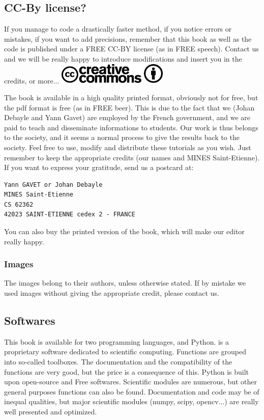 \subsection*{CC-By license?}
If you manage to code a drastically faster method, if you notice errors or mistakes, if you want to add precisions, remember that this book as well as the code is published under a FREE CC-BY license (as in FREE speech). Contact us and we will be really happy to introduce modifications and insert you in the credits, or more...
\includegraphics[height=1cm]{media/cc.logo.pdf}
\includegraphics[height=1cm]{media/BY.pdf}



The book is available in a high quality printed format, obviously not for free, but the pdf format is free (as in FREE beer). This is due to the fact that we (Johan Debayle and Yann Gavet) are employed by the French government, and we are paid to teach and disseminate informations to students. Our work is thus belongs to the society, and it seems a normal process to give the results back to the society. Feel free to use, modify and distribute these tutorials as you wish. Just remember to keep the appropriate credits (our names and MINES Saint-Etienne). If you want to express your gratitude, send us a postcard at:
\begin{verbatim}
Yann GAVET or Johan Debayle
MINES Saint-Etienne
CS 62362
42023 SAINT-ETIENNE cedex 2 - FRANCE
\end{verbatim}

You can also buy the printed version of the book, which will make our editor really happy.

\subsubsection*{Images}
The images belong to their authors, unless otherwise stated. If by mistake we used images without giving the appropriate credit, please contact us.

\subsection*{Softwares}
This book is available for two programming languages, \matlabregistered{} and Python. \matlabregistered{} is a proprietary software dedicated to scientific computing. Functions are grouped into so-called toolboxes. The documentation and the compatibility of the functions are very good, but the price is a consequence of this. Python is built upon open-source and Free softwares. Scientific modules are numerous, but other general purposes functions can also be found. Documentation and code may be of inequal qualities, but major scientific modules (numpy, scipy, opencv...) are really well presented and optimized. 

